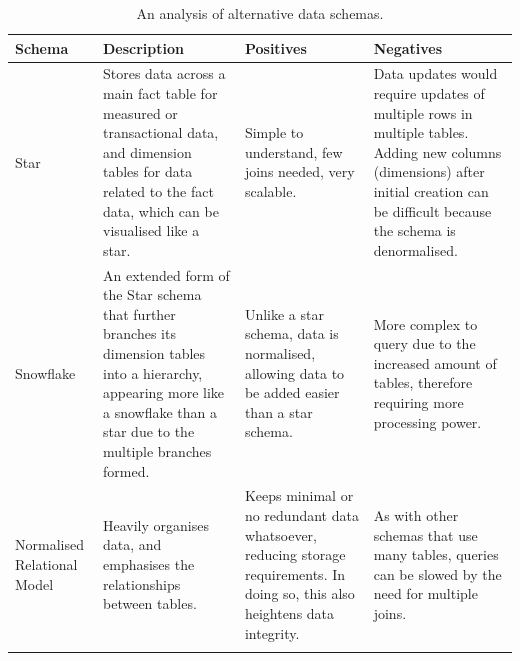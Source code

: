 \documentclass[12pt]{report}
\begin{document}
\begin{longtable}{ |p{}| p{}| p{} | p{} | }
    \hline
    \cellcolor{blue!25}Schema & \cellcolor{blue!25}Description & \cellcolor{blue!25}Positives & \cellcolor{blue!25}Negatives \\
    \hline
    Star
    \autocite{kaminsky_star_nodate} & Stores data across a main fact table for measured or transactional data, and dimension tables 
    for data related to the fact data, which can be visualised like a star. & Simple to understand, few joins needed,
    very scalable. & Data updates would require updates of multiple rows in multiple tables. Adding new columns
    (dimensions) after initial creation can be difficult because the schema is denormalised.\\
    \hline
    Snowflake
    \autocite{geeksforgeeks_snowflake_2023} & An extended form of the Star schema that further branches its dimension tables
    into a hierarchy, appearing more like a snowflake than a star due to the multiple branches formed. &
    Unlike a star schema, data is normalised, allowing data to be added easier than a star schema. & More 
    complex to query due to the increased amount of tables, therefore requiring more processing power. \\
    \hline
    Normalised Relational Model 
    \autocite{microsoft_database_2024} & Heavily organises data, and emphasises the relationships between tables. &
    Keeps minimal or no redundant data whatsoever, reducing storage requirements. In doing so, this also heightens 
    data integrity. & As with other schemas that use many tables, queries can be slowed by the need for multiple 
    joins. \\
    \hline 
    \caption{An analysis of alternative data schemas.}\label{tab:Schemas}
\end{longtable}
\end{document}
